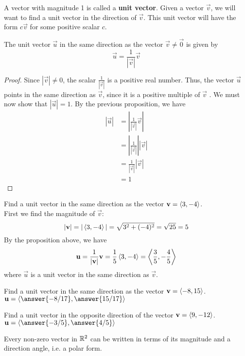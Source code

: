 \documentclass[handout]{ximera}
\begin{document}
A vector with magnitude 1 is called a {\bf unit vector}. Given a vector $\vec{v}$, we will want to find a unit vector in the direction of $\vec{v}$.
This unit vector will have the form $c\vec{v}$ for some positive scalar $c$.  
\begin{proposition}
The unit vector $\vec{u}$ in the same direction as the vector $\vec{v} \neq \vec{0}$ is given by 
\[
\vec{u} = \frac{1}{|\vec{v}|} \vec{v}
\]
\begin{proof}
Since $|\vec{v}| \neq 0$, the scalar $\displaystyle \frac{1}{|\vec{v}|}$ is a positive real number.  Thus, the vector $\vec{u}$ points 
in the same direction as $\vec{v}$, since it is a positive multiple of $\vec{v}$ . We must now show that $|\vec{u}| = 1$.  
By the previous proposition, we have
\begin{align*}
|\vec{u}| &= \left| \frac{1}{|\vec{v}|} \vec{v} \right|\\
           &= \left| \frac{1}{|\vec{v}|} \right| |\vec{v}|\\
           &= \frac{1}{|\vec{v}|} |\vec{v}|\\
           &= 1
\end{align*}
\end{proof}
\end{proposition}

\begin{example}
Find a unit vector in the same direction as the vector $\mathbf{v} = \left\langle 3, -4\right\rangle$.\\
First we find the magnitude of $\vec{v}$:
\[
|\mathbf{v}| = |\left\langle 3, -4\right\rangle| = \sqrt{3^2 + (-4)^2} = \sqrt{25} = 5
\]
By the proposition above, we have
\[
\mathbf{u} = \frac{1}{|\mathbf{v}|} \mathbf{v} = \frac15 \left\langle 3, -4\right\rangle = \left\langle \frac35, -\frac45\right\rangle
\]
where $\vec{u}$ is a unit vector in the same direction as $\vec{v}$.
\end{example}

\begin{problem}
Find a unit vector in the same direction as the vector $\mathbf{v} = \left\langle -8, 15\right\rangle$.\\
$\vec{u} = \vector{\answer{-8/17}, \answer{15/17}}$
\end{problem}

\begin{problem}
Find a unit vector in the opposite direction of the vector $\mathbf{v} = \left\langle 9, -12\right\rangle$.\\
$\vec{u} = \vector{\answer{-3/5}, \answer{4/5}}$
\end{problem}

Every non-zero vector in $\mathbb R^2$ can be written in terms of its magnitude and a direction angle, i.e. a polar form.
\end{document}
